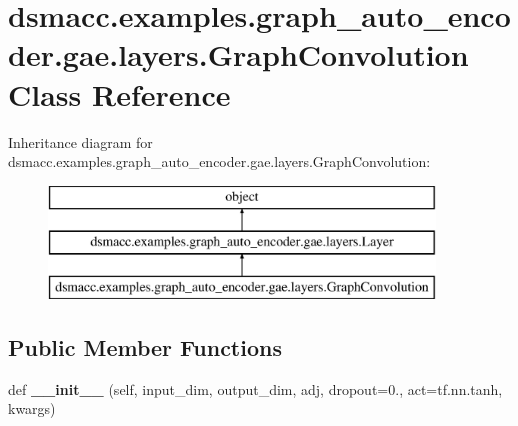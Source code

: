\hypertarget{classdsmacc_1_1examples_1_1graph__auto__encoder_1_1gae_1_1layers_1_1GraphConvolution}{}\section{dsmacc.\+examples.\+graph\+\_\+auto\+\_\+encoder.\+gae.\+layers.\+Graph\+Convolution Class Reference}
\label{classdsmacc_1_1examples_1_1graph__auto__encoder_1_1gae_1_1layers_1_1GraphConvolution}
Inheritance diagram for dsmacc.\+examples.\+graph\+\_\+auto\+\_\+encoder.\+gae.\+layers.\+Graph\+Convolution\+:\begin{figure}[H]
\begin{center}
\leavevmode
\includegraphics[height=3.000000cm]{classdsmacc_1_1examples_1_1graph__auto__encoder_1_1gae_1_1layers_1_1GraphConvolution}
\end{center}
\end{figure}
\subsection*{Public Member Functions}
\begin{DoxyCompactItemize}
\item 
\mbox{\label{classdsmacc_1_1examples_1_1graph__auto__encoder_1_1gae_1_1layers_1_1GraphConvolution_a839da09e78cccb70cce37955f1c543a6}} 
def {\bfseries \+\_\+\+\_\+init\+\_\+\+\_\+} (self, input\+\_\+dim, output\+\_\+dim, adj, dropout=0., act=tf.\+nn.\+tanh, kwargs)
\end{DoxyCompactItemize}
